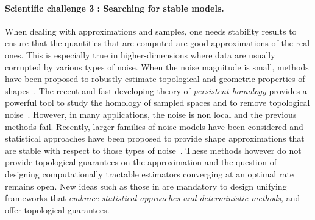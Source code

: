 \paragraph{Scientific challenge 3 : Searching for stable models.} 
When dealing with approximations and samples, one needs stability results to ensure that the quantities that are computed are good approximations of the real ones. This is especially true in higher-dimensions where data are usually corrupted by various types of noise.  When the noise magnitude is small, methods have been proposed to robustly estimate topological and geometric properties of shapes~\cite{nsw-tvu-2011}.  The recent and fast developing theory of {\em persistent homology} provides a powerful tool to study  the homology of sampled spaces and to remove topological noise~\cite{hh-ct-2010}.
However, in  many applications, the noise is non local and the previous methods fail.
Recently,  larger families of noise models  have been considered and statistical approaches  have been proposed to provide shape approximations that are stable with respect to   those types of noise~\cite{gpvw-mme-2011}. These methods however do not provide topological guarantees on the approximation and the question of designing computationally tractable estimators converging at an optimal rate remains open. New ideas such as those in \cite{ccsm-gipm-2011} are mandatory to 
design  unifying frameworks that {\em embrace statistical approaches and deterministic methods}, and offer topological guarantees. 


\vspace{-3mm}

